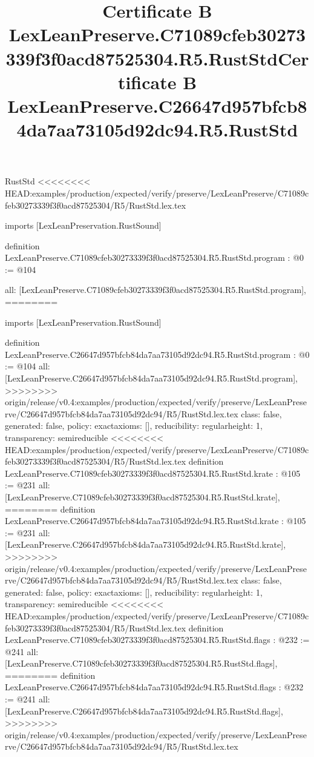\begin{lexlean}{RustStd}
<<<<<<<< HEAD:examples/production/expected/verify/preserve/LexLeanPreserve/C71089cfeb30273339f3f0acd87525304/R5/RustStd.lex.tex
\title{Certificate B LexLeanPreserve.C71089cfeb30273339f3f0acd87525304.R5.RustStd}
\begin{coremodule}
imports [LexLeanPreservation.RustSound]

definition LexLeanPreserve.C71089cfeb30273339f3f0acd87525304.R5.RustStd.program : @0 := @104 {
  all: [LexLeanPreserve.C71089cfeb30273339f3f0acd87525304.R5.RustStd.program],
========
\title{Certificate B LexLeanPreserve.C26647d957bfcb84da7aa73105d92dc94.R5.RustStd}
\begin{coremodule}
imports [LexLeanPreservation.RustSound]

definition LexLeanPreserve.C26647d957bfcb84da7aa73105d92dc94.R5.RustStd.program : @0 := @104 {
  all: [LexLeanPreserve.C26647d957bfcb84da7aa73105d92dc94.R5.RustStd.program],
>>>>>>>> origin/release/v0.4:examples/production/expected/verify/preserve/LexLeanPreserve/C26647d957bfcb84da7aa73105d92dc94/R5/RustStd.lex.tex
  class: false,
  generated: false,
  policy: exact{axioms: []},
  reducibility: regular{height: 1},
  transparency: semireducible
}
<<<<<<<< HEAD:examples/production/expected/verify/preserve/LexLeanPreserve/C71089cfeb30273339f3f0acd87525304/R5/RustStd.lex.tex
definition LexLeanPreserve.C71089cfeb30273339f3f0acd87525304.R5.RustStd.krate : @105 := @231 {
  all: [LexLeanPreserve.C71089cfeb30273339f3f0acd87525304.R5.RustStd.krate],
========
definition LexLeanPreserve.C26647d957bfcb84da7aa73105d92dc94.R5.RustStd.krate : @105 := @231 {
  all: [LexLeanPreserve.C26647d957bfcb84da7aa73105d92dc94.R5.RustStd.krate],
>>>>>>>> origin/release/v0.4:examples/production/expected/verify/preserve/LexLeanPreserve/C26647d957bfcb84da7aa73105d92dc94/R5/RustStd.lex.tex
  class: false,
  generated: false,
  policy: exact{axioms: []},
  reducibility: regular{height: 1},
  transparency: semireducible
}
<<<<<<<< HEAD:examples/production/expected/verify/preserve/LexLeanPreserve/C71089cfeb30273339f3f0acd87525304/R5/RustStd.lex.tex
definition LexLeanPreserve.C71089cfeb30273339f3f0acd87525304.R5.RustStd.flags : @232 := @241 {
  all: [LexLeanPreserve.C71089cfeb30273339f3f0acd87525304.R5.RustStd.flags],
========
definition LexLeanPreserve.C26647d957bfcb84da7aa73105d92dc94.R5.RustStd.flags : @232 := @241 {
  all: [LexLeanPreserve.C26647d957bfcb84da7aa73105d92dc94.R5.RustStd.flags],
>>>>>>>> origin/release/v0.4:examples/production/expected/verify/preserve/LexLeanPreserve/C26647d957bfcb84da7aa73105d92dc94/R5/RustStd.lex.tex
}}}
\end{coremodule}}
\end{coremodule}
\end{lexlean}
